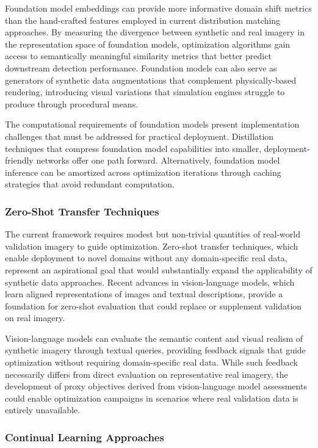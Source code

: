 Foundation model embeddings can provide more informative domain shift metrics than the hand-crafted features employed in current distribution matching approaches. By measuring the divergence between synthetic and real imagery in the representation space of foundation models, optimization algorithms gain access to semantically meaningful similarity metrics that better predict downstream detection performance. Foundation models can also serve as generators of synthetic data augmentations that complement physically-based rendering, introducing visual variations that simulation engines struggle to produce through procedural means.

The computational requirements of foundation models present implementation challenges that must be addressed for practical deployment. Distillation techniques that compress foundation model capabilities into smaller, deployment-friendly networks offer one path forward. Alternatively, foundation model inference can be amortized across optimization iterations through caching strategies that avoid redundant computation.

\subsubsection{Zero-Shot Transfer Techniques}
\label{subsubsec:zeroshot}

The current framework requires modest but non-trivial quantities of real-world validation imagery to guide optimization. Zero-shot transfer techniques, which enable deployment to novel domains without any domain-specific real data, represent an aspirational goal that would substantially expand the applicability of synthetic data approaches. Recent advances in vision-language models, which learn aligned representations of images and textual descriptions, provide a foundation for zero-shot evaluation that could replace or supplement validation on real imagery.

Vision-language models can evaluate the semantic content and visual realism of synthetic imagery through textual queries, providing feedback signals that guide optimization without requiring domain-specific real data. While such feedback necessarily differs from direct evaluation on representative real imagery, the development of proxy objectives derived from vision-language model assessments could enable optimization campaigns in scenarios where real validation data is entirely unavailable.

\subsubsection{Continual Learning Approaches}
\label{subsubsec:continual}

